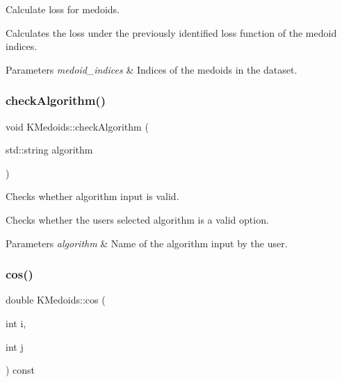 Calculate loss for medoids. 

Calculates the loss under the previously identified loss function of the medoid indices.


\begin{DoxyParams}{Parameters}
{\em medoid\+\_\+indices} & Indices of the medoids in the dataset. \\
\hline
\end{DoxyParams}
\mbox{\label{classKMedoids_af5b9331755cd049afb05af8ecee3aeb5}} 
\subsubsection{\texorpdfstring{check\+Algorithm()}{checkAlgorithm()}}
{\footnotesize\ttfamily void K\+Medoids\+::check\+Algorithm (\begin{DoxyParamCaption}\item[{std\+::string}]{algorithm }\end{DoxyParamCaption})\hspace{0.3cm}{\ttfamily [private]}}



Checks whether algorithm input is valid. 

Checks whether the user\textquotesingle{}s selected algorithm is a valid option.


\begin{DoxyParams}{Parameters}
{\em algorithm} & Name of the algorithm input by the user. \\
\hline
\end{DoxyParams}
\mbox{\label{classKMedoids_abbf053b7aa63badfc4e76a62a91a3e96}} 
\subsubsection{\texorpdfstring{cos()}{cos()}}
{\footnotesize\ttfamily double K\+Medoids\+::cos (\begin{DoxyParamCaption}\item[{int}]{i,  }\item[{int}]{j }\end{DoxyParamCaption}) const\hspace{0.3cm}{\ttfamily [private]}}



